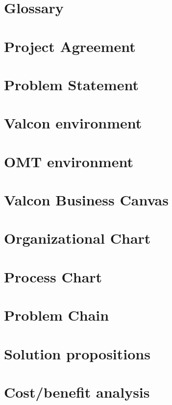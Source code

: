 \chapter{Glossary}

\chapter{Project Agreement}

\chapter{Problem Statement}

\chapter{Valcon environment}

\chapter{OMT environment}

\chapter{Valcon Business Canvas}


\label{app:it_strategy}

\chapter{Organizational Chart}

\chapter{Process Chart}

\chapter{Problem Chain}

\chapter{Solution propositions}

\chapter{Cost/benefit analysis}

